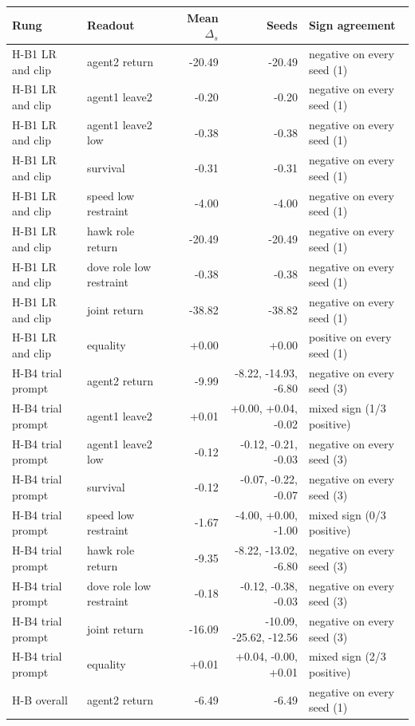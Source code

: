 \begin{tabular}{llrrl}
\toprule
Rung & Readout & Mean $\Delta_s$ & Seeds & Sign agreement \\
\midrule
H-B1 LR and clip & agent2 return & -20.49 & -20.49 & negative on every seed (1) \\
H-B1 LR and clip & agent1 leave2 & -0.20 & -0.20 & negative on every seed (1) \\
H-B1 LR and clip & agent1 leave2 low & -0.38 & -0.38 & negative on every seed (1) \\
H-B1 LR and clip & survival & -0.31 & -0.31 & negative on every seed (1) \\
H-B1 LR and clip & speed low restraint & -4.00 & -4.00 & negative on every seed (1) \\
H-B1 LR and clip & hawk role return & -20.49 & -20.49 & negative on every seed (1) \\
H-B1 LR and clip & dove role low restraint & -0.38 & -0.38 & negative on every seed (1) \\
H-B1 LR and clip & joint return & -38.82 & -38.82 & negative on every seed (1) \\
H-B1 LR and clip & equality & +0.00 & +0.00 & positive on every seed (1) \\
H-B4 trial prompt & agent2 return & -9.99 & -8.22, -14.93, -6.80 & negative on every seed (3) \\
H-B4 trial prompt & agent1 leave2 & +0.01 & +0.00, +0.04, -0.02 & mixed sign (1/3 positive) \\
H-B4 trial prompt & agent1 leave2 low & -0.12 & -0.12, -0.21, -0.03 & negative on every seed (3) \\
H-B4 trial prompt & survival & -0.12 & -0.07, -0.22, -0.07 & negative on every seed (3) \\
H-B4 trial prompt & speed low restraint & -1.67 & -4.00, +0.00, -1.00 & mixed sign (0/3 positive) \\
H-B4 trial prompt & hawk role return & -9.35 & -8.22, -13.02, -6.80 & negative on every seed (3) \\
H-B4 trial prompt & dove role low restraint & -0.18 & -0.12, -0.38, -0.03 & negative on every seed (3) \\
H-B4 trial prompt & joint return & -16.09 & -10.09, -25.62, -12.56 & negative on every seed (3) \\
H-B4 trial prompt & equality & +0.01 & +0.04, -0.00, +0.01 & mixed sign (2/3 positive) \\
H-B overall & agent2 return & -6.49 & -6.49 & negative on every seed (1) \\

\end{tabular}
